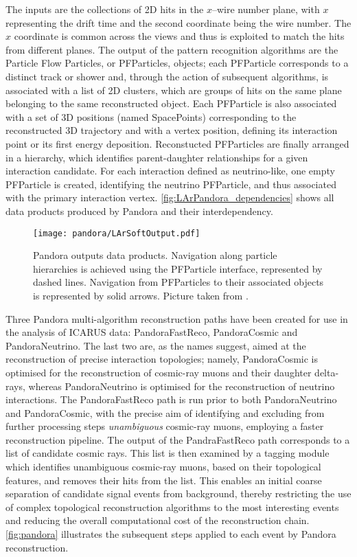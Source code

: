 The inputs are the collections of 2D hits in the $x$--wire number plane, with $x$ representing the drift time and the second coordinate being the wire number. The $x$ coordinate is common across the views and thus is exploited to match the hits from different planes. The output of the pattern recognition algorithms are the Particle Flow Particles, or PFParticles, objects; each PFParticle corresponds to a distinct track or shower and, through the action of subsequent algorithms, is associated with a list of 2D clusters, which are groups of hits on the same plane belonging to the same reconstructed object. Each PFParticle is also associated with a set of 3D positions (named SpacePoints) corresponding to the reconstructed 3D trajectory and with a vertex position, defining its interaction point or its first energy deposition. Reconstucted PFParticles are finally arranged in a hierarchy, which identifies parent-daughter relationships for a given interaction candidate. For each interaction defined as neutrino-like, one empty PFParticle is created, identifying the neutrino PFParticle, and thus associated with the primary interaction vertex. \autoref{fig:LArPandora_dependencies} shows all data products produced by Pandora and their interdependency. 

\begin{figure}
    \centering
    \texttt{[image: pandora/LArSoftOutput.pdf]}
    \caption[LArPandora output data products]{Pandora outputs data products. Navigation along particle hierarchies is achieved using the PFParticle interface, represented by dashed lines. Navigation from PFParticles to their associated objects is represented by solid arrows. Picture taken from \cite{MicroBooNE:2017xvs}. }
    \label{fig:LArPandora_dependencies}
\end{figure}

Three Pandora multi-algorithm reconstruction paths have been created for use in the analysis of ICARUS data: PandoraFastReco, PandoraCosmic and PandoraNeutrino. The last two are, as the names suggest, aimed at the reconstruction of precise interaction topologies; namely,  PandoraCosmic is optimised for the reconstruction of cosmic-ray muons and their daughter delta-rays, whereas PandoraNeutrino is optimised for the reconstruction of neutrino interactions. The PandoraFastReco path is run prior to both PandoraNeutrino and PandoraCosmic, with the precise aim of identifying and excluding from further processing steps \emph{unambiguous} cosmic-ray muons, employing a faster reconstruction pipeline. The output of the PandraFastReco path corresponds to a list of candidate cosmic rays. This list is then examined by a tagging module which identifies unambiguous cosmic-ray muons, based on their topological features, and removes their hits from the list. This enables an initial coarse separation of candidate signal events from background, thereby restricting the use of complex topological reconstruction algorithms to the most interesting events and reducing the overall computational cost of the reconstruction chain. \autoref{fig:pandora} illustrates the subsequent steps applied to each event by Pandora reconstruction. 

